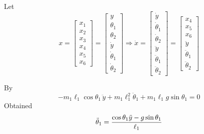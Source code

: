 \documentclass[12pt,a4paper]{article}
\begin{document}
Let 
\[
x = \begin{bmatrix}
	x_1 \\ x_2 \\ x_3 \\ x_4 \\ x_5 \\ x_6
\end{bmatrix} = \begin{bmatrix}
y \\ \theta_1 \\ \theta_2 \\ \dot y \\ \dot \theta_1 \\ \dot \theta_2
\end{bmatrix} \Rightarrow \dot x = \begin{bmatrix}
\dot y \\ \dot \theta_1 \\ \dot \theta_2 \\ \ddot y \\ \ddot \theta_1 \\ \ddot \theta_2 
\end{bmatrix} = \begin{bmatrix}
x_4 \\ x_5 \\ x_6 \\ \ddot y \\ \ddot \theta_1 \\ \ddot \theta_2
\end{bmatrix}
\]

By
\[
-m_1\ell_1\cos\theta_1\,\ddot y+m_1\ell_1^2\ddot\theta_1+m_1\ell_1g\sin\theta_1=0
\]
Obtained
\[
\ddot \theta_1 = { \cos\theta_1 \ddot y - g\sin\theta_1  \over \ell_1}
\]
\end{document}

